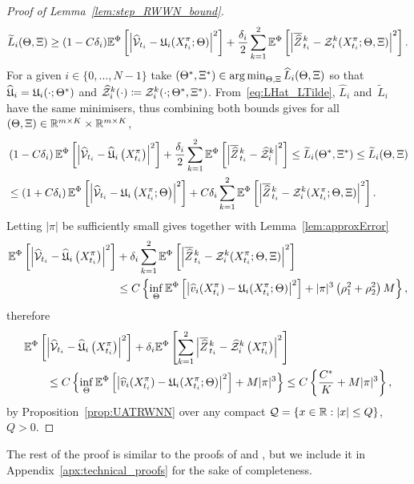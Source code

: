 \begin{proof}[Proof of Lemma~\ref{lem:step_RWWN_bound}]
    \[
        \widetilde{L}_i(\Theta, \Xi) \geq (1-C\delta_{i} )\mathbb{E}^\Phi\left[\left\lvert \widehat {\mathcal{V}}_{t_i} - \mathfrak{U}_i(X^\pi_{t_i}; \Theta)\right\rvert^2\right] + \frac{\delta_{i}}2\sum_{k=1}^2\mathbb{E}^\Phi\left[ \left\lvert \overline{\widehat{Z}}\kern0.1em^{k}_{t_{i}} - \mathcal{Z}_i^k(X^\pi_{t_i}; \Theta, \Xi)\right\rvert^2\right].
    \]
For a given $i\in\{0,\dots,N-1\}$ take $(\Theta^*, \Xi^*)\in\operatorname*{arg\,min}_{\Theta, \Xi} \widehat{L}_i(\Theta, \Xi)$ so that $\widehat{\mathfrak{U}}_i=\mathfrak{U}_i(\cdot; \Theta^*)$ and $\widehat{\mathcal{Z}}_i^k(\cdot) \coloneqq  \mathcal{Z}^k_i(\cdot; \Theta^*, \Xi^*)$. 
    From~\eqref{eq:LHat_LTilde}, $\widehat{L}_i$ and~$\widetilde{L}_i$ have the same minimisers, thus combining both bounds gives for all $(\Theta,\Xi)\in\mathbb{R}^{m\times K}\times\mathbb{R}^{m\times K}$,
    \begin{align*}
            &\left(1-C \delta_{i} \right) \mathbb{E}^\Phi\left[\left|\widehat {\mathcal{V}}_{t_{i}}-\widehat{\mathfrak{U}}_{i}\left(X^\pi_{t_{i}}\right)\right|^{2}\right]+\frac{\delta_{i}}2\sum_{k=1}^2\mathbb{E}^\Phi\left[ \left\lvert \overline{\widehat{Z}}\kern0.1em^{k}_{t_{i}} - \widehat{\mathcal{Z}}_i^k\right\rvert^2\right] \leq \widetilde{L}_i(\Theta^*,\Xi^*)\leq \widetilde{L}_{i}(\Theta, \Xi) \\
            &\leq\left(1+C \delta_{i} \right) \mathbb{E}^\Phi\left[\left|\widehat {\mathcal{V}}_{t_{i}}-\mathfrak{U}_{i}\left(X^\pi_{t_{i}} ; \Theta\right)\right|^{2}\right]+C \delta_{i} \sum_{k=1}^2\mathbb{E}^\Phi\left[ \left\lvert \overline{\widehat{Z}}\kern0.1em^{k}_{t_{i}} - \mathcal{Z}_i^k(X^\pi_{t_i}; \Theta, \Xi)\right\rvert^2\right].
    \end{align*}
    Letting $|\pi|$ be sufficiently small gives together with Lemma~\ref{lem:approxError}
    \begin{align*}
        \mathbb{E}^\Phi\left[\left|\widehat {\mathcal{V}}_{t_{i}}-\widehat{\mathfrak{U}}_{i}\left(X^\pi_{t_{i}}\right)\right|^{2}\right] &+ \delta_{i}  \sum_{k=1}^2\mathbb{E}^\Phi\left[ \left\lvert \overline{\widehat{Z}}\kern0.1em^{k}_{t_{i}} - \mathcal{Z}_i^k(X^\pi_{t_i}; \Theta, \Xi)\right\rvert^2\right] \\ 
        &\leq C \left\{\inf_\Theta\mathbb{E}^\Phi\left[\left|\widehat v_i(X^\pi_{t_i})-\mathfrak{U}_i(X^\pi_{t_i}; \Theta)\right|^2\right]
         + |\pi|^3\left(\rho_1^2  + \rho_2^2\right)M\right\},
    \end{align*}
    therefore
    \begin{align*}
    &\mathbb{E}^\Phi\left[\left|\widehat{\mathcal{V}}_{t_{i}}-\widehat{\mathfrak{U}}_{i}\left(X^\pi_{t_{i}}\right)\right|^{2}\right] + \delta_{i}  \mathbb{E}^\Phi\left[\sum_{k=1}^2\left|\overline{\widehat{Z}}\kern0.1em^{k}_{t_{i}}-\widehat{\mathcal{Z}}^k_{i}\left(X^\pi_{t_{i}}\right)\right|^{2}\right] \\
    & \qquad \leq C\left\{ \inf_\Theta\mathbb{E}^\Phi\left[\left|\widehat v_i(X^\pi_{t_i})-\mathfrak{U}_i(X^\pi_{t_i}; \Theta)\right|^2\right]
    + M|\pi|^3 \right\}
    \leq C\left\{ \frac{C^{*}}{K}  + M|\pi|^3 \right\},
    \end{align*}
    by Proposition~\ref{prop:UATRWNN} over any compact $\mathcal{Q} = \{x\in\mathbb{R}: |x|\leq Q\}$, $Q>0$.
\end{proof}
The rest of the proof is similar to the proofs of \cite[Theorem A.2]{Bayer2022PricingSPDEs} and \cite[Theorem~4.1]{Hure2020DeepPDEs}, but we include it in Appendix~\ref{apx:technical_proofs} for the sake of completeness. 

